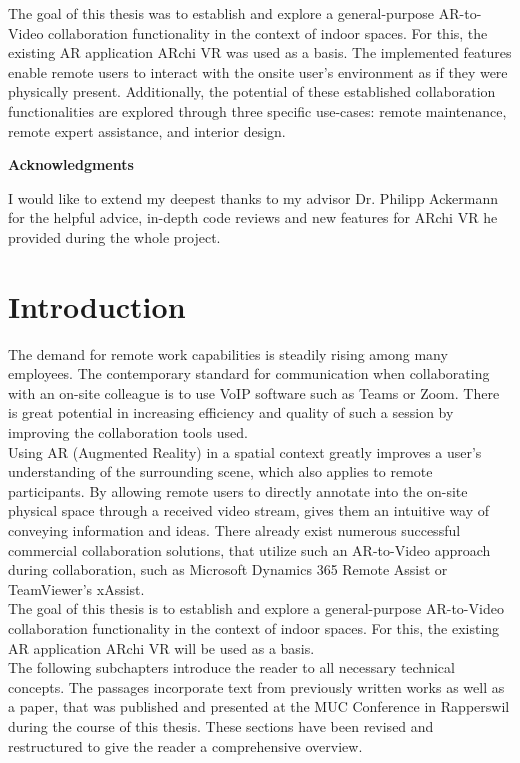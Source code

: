 \documentclass{article}
\begin{document}
The goal of this thesis was to establish and explore a general-purpose AR-to-Video collaboration functionality in the context of indoor spaces. For this, the existing AR application ARchi VR was used as a basis. The implemented features enable remote users to interact with the onsite user's environment as if they were physically present. Additionally, the potential of these established collaboration functionalities are explored through three specific use-cases: remote maintenance, remote expert assistance, and interior design.
\newpage
\begin{center}
    \Large
    \textbf{Acknowledgments}
\end{center}
I would like to extend my deepest thanks to my advisor Dr. Philipp Ackermann for the helpful advice, in-depth code reviews and new features for ARchi VR he provided during the whole project.
\newpage
\tableofcontents
\newpage

\section{Introduction}
The demand for remote work capabilities is steadily rising among many employees. The contemporary standard for communication when collaborating with an on-site colleague is to use VoIP software such as Teams or Zoom. There is great potential in increasing efficiency and quality of such a session by improving the collaboration tools used.\\
Using AR (Augmented Reality) in a spatial context greatly improves a user's understanding of the surrounding scene, which also applies to remote participants.
By allowing remote users to directly annotate into the on-site physical space through a received video stream, gives them an intuitive way of conveying information and ideas. There already exist numerous successful commercial collaboration solutions, that utilize such an AR-to-Video approach during collaboration, such as Microsoft Dynamics 365 Remote Assist or TeamViewer's xAssist.\\
The goal of this thesis is to establish and explore a general-purpose AR-to-Video collaboration functionality in the context of indoor spaces. For this, the existing AR application ARchi VR will be used as a basis. \\
The following subchapters introduce the reader to all necessary technical concepts. The passages incorporate text from previously written works as well as a paper, that was published and presented at the MUC Conference in Rapperswil during the course of this thesis. These sections have been revised and restructured to give the reader a comprehensive overview. 
\end{document}
